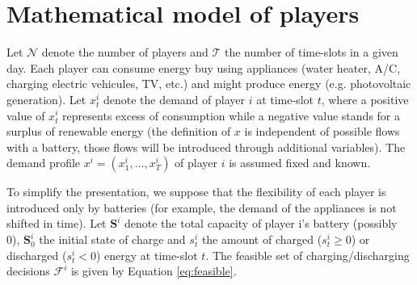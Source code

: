 \documentclass[runningheads]{llncs}
\newcommand{\li}[1][]{x^i_{#1}}
\newcommand{\bai}[1][]{s^i_{#1}}
\newcommand{\fsi}{\mathcal{F}^i}
\newcommand{\storagei}{\mathbf{S}^i}
\newcommand{\bini}{\mathbf{S}^i_0}
\newcommand{\N}{\mathcal{N}}
\newcommand{\T}{\mathcal{T}}
\begin{document}





\section{Mathematical model of players}

Let $\N$ denote the number of players and $\T$ the number of time-slots in a given day. Each player can consume energy buy using appliances (water heater, A/C, charging electric vehicules, TV, etc.) and might produce energy (e.g. photovoltaic generation). Let $\li[t]$ denote the demand of player $i$ at time-slot $t$, where a positive value of $\li[t]$ represents excess of consumption while a negative value stands for a surplus of renewable energy (the definition of $x$ is independent of possible flows with a battery, those flows will be introduced through additional variables). The demand profile $\li=(\li[1], \dots, \li[T])$ of player $i$ is assumed fixed and known. 

To simplify the presentation, we suppose that the flexibility of each player is introduced only by batteries (for example, the demand of the appliances is not shifted in time). Let $\storagei$ denote the total capacity of player i’s battery (possibly 0), $\bini$ the initial state of charge and $\bai[t]$ the amount of charged ($\bai[t] \geq 0$) or discharged ($\bai[t] < 0$) energy at time-slot $t$. 
The feasible set of charging/discharging decisions $\fsi$ is given by Equation \eqref{eq:feasible}. 
\end{document}

